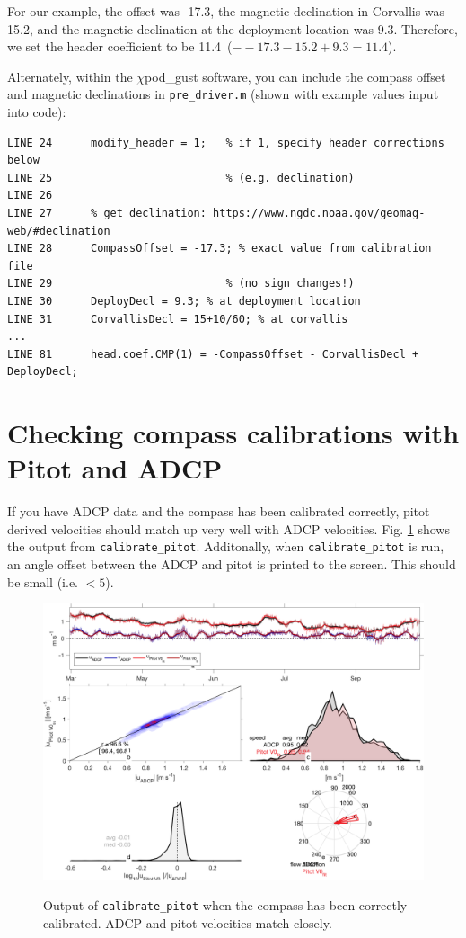 \documentclass[12pt]{article}
\begin{document}
For our example, the offset was -17.3\degree, the magnetic declination in Corvallis was 15.2\degree, and the magnetic declination at the deployment location was 9.3\degree. Therefore, we set the header coefficient to be 11.4\degree \, ($--17.3 - 15.2 + 9.3 = 11.4$).

Alternately, within the $\chi$pod\_gust software, you can include the compass offset and magnetic declinations in \texttt{pre\_driver.m} (shown with example values input into code):
\begin{verbatim}
LINE 24      modify_header = 1;   % if 1, specify header corrections below
LINE 25                           % (e.g. declination)
LINE 26   
LINE 27      % get declination: https://www.ngdc.noaa.gov/geomag-web/#declination
LINE 28      CompassOffset = -17.3; % exact value from calibration file
LINE 29                           % (no sign changes!)
LINE 30      DeployDecl = 9.3; % at deployment location
LINE 31      CorvallisDecl = 15+10/60; % at corvallis
...
LINE 81      head.coef.CMP(1) = -CompassOffset - CorvallisDecl + DeployDecl;
\end{verbatim}

\clearpage
\section{Checking compass calibrations with Pitot and ADCP}

If you have ADCP data and the compass has been calibrated correctly, pitot derived velocities should match up very well with ADCP velocities. Fig. \ref{fig:pitotADCP} shows the output from \texttt{calibrate\_pitot}. Additonally, when \texttt{calibrate\_pitot} is run, an angle offset between the ADCP and pitot is printed to the screen. This should be small (i.e. $<5$\degree).

\begin{figure}[h]
  \centering \centering\noindent\includegraphics[width=14cm,angle=0]{./figs/Pitot_vs_ADCP_resized.png}\\
    \caption{Output of \texttt{calibrate\_pitot} when the compass has been correctly calibrated. ADCP and pitot velocities match closely.}\label{fig:pitotADCP}
\end{figure}
\end{document}
